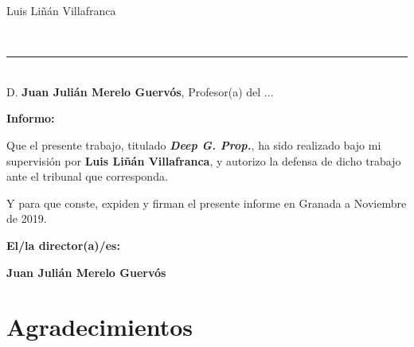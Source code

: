 \begin{center}

    Luis Liñán Villafranca\\

\end{center}

\vspace{0.5cm}
\vspace{0.7cm}

\\


\cleardoublepage

\thispagestyle{empty}

\noindent\rule[-1ex]{\textwidth}{2pt}\\[4.5ex]

D. \textbf{Juan Julián Merelo Guervós}, Profesor(a) del ...

\vspace{0.5cm}

\textbf{Informo:}

\vspace{0.5cm}

Que el presente trabajo, titulado \textit{\textbf{Deep G. Prop.}}, ha sido realizado
bajo mi supervisión por \textbf{Luis Liñán Villafranca}, y autorizo la defensa de dicho
trabajo ante el tribunal que corresponda.

\vspace{0.5cm}

Y para que conste, expiden y firman el presente informe en Granada a Noviembre de
2019.

\vspace{1cm}

\textbf{El/la director(a)/es:}

\vspace{5cm}

\noindent\textbf{Juan Julián Merelo Guervós}

\chapter*{Agradecimientos}




